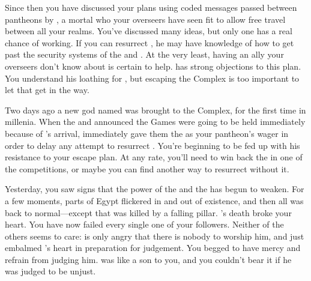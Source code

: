 \documentclass[char]{guardians}
\begin{document}
Since then you have discussed your plans using coded messages passed between pantheons by \cJascha{}, a mortal who your overseers have seen fit to allow free travel between all your realms. You've discussed many ideas, but only one has a real chance of working. If you can resurrect \cSet{}, he may have knowledge of how to get past the security systems of the \cWarden{} and \cCaretaker{}. At the very least, having an ally your overseers don't know about is certain to help. \cOsiris{} has strong objections to this plan. You understand his loathing for \cSet{}, but escaping the Complex is too important to let that get in the way.



Two days ago a new god named \cUnity{} was brought to the Complex, for the first time in millenia. When the \cWarden{} and \cCaretaker{} announced the Games were going to be held immediately because of \cUnity{}'s arrival, \cOsiris{} immediately gave them the \iNecro{\MYname} as your pantheon's wager in order to delay any attempt to resurrect \cSet{}. You're beginning to be fed up with his resistance to your escape plan. At any rate, you'll need to win back the \iNecro{\MYname} in one of the competitions, or maybe you can find another way to resurrect \cSet{} without it.

Yesterday, you saw signs that the power of the \cWarden{} and the \cCaretaker{} has begun to weaken. For a few moments, parts of Egypt flickered in and out of existence, and then all was back to normal---except that \cEgyptianHuman{} was killed by a falling pillar. \cEgyptianHuman{}'s death broke your heart. You have now failed every single one of your followers. Neither of the others seems to care: \cOsiris{} is only angry that there is nobody to worship him, and \cAnubis{} just embalmed \cEgyptianHuman{}'s heart in preparation for judgement. You begged \cAnubis{} to have mercy and refrain from judging him. \cEgyptianHuman{} was like a son to you, and you couldn't bear it if he was judged to be unjust.
\end{document}
